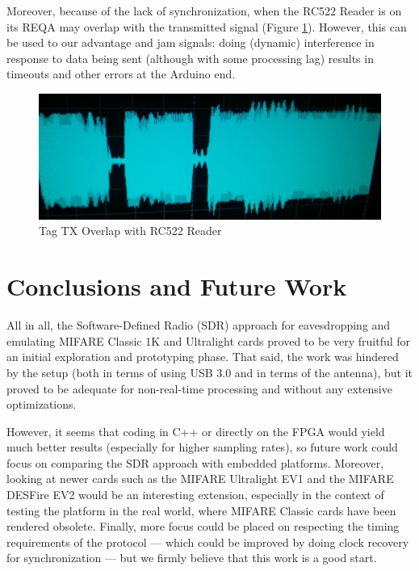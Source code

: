 \documentclass[fleqn,10pt]{SelfArx} %
\begin{document}
Moreover, because of the lack of synchronization, when the RC522 Reader is on its REQA may overlap with the transmitted signal (Figure \ref{fig:overlap}). However, this can be used to our advantage and jam signals: doing (dynamic) interference in response to data being sent (although with some processing lag) results in timeouts and other errors at the Arduino end.

\begin{figure}[h]
  \includegraphics[width=\linewidth]{img/overlap}
  \caption{Tag TX Overlap with RC522 Reader}
  \label{fig:overlap}
\end{figure}


\section{Conclusions and Future Work}
\label{sec:conclusions}

All in all, the Software-Defined Radio (SDR) approach for eavesdropping and emulating MIFARE Classic 1K and Ultralight cards proved to be very fruitful for an initial exploration and prototyping phase. That said, the work was hindered by the setup (both in terms of using USB 3.0 and in terms of the antenna), but it proved to be adequate for non-real-time processing and without any extensive optimizations. 

However, it seems that coding in C++ or directly on the FPGA would yield much better results (especially for higher sampling rates), so future work could focus on comparing the SDR approach with embedded platforms. Moreover, looking at newer cards such as the MIFARE Ultralight EV1 and the MIFARE DESFire EV2 would be an interesting extension, especially in the context of testing the platform in the real world, where MIFARE Classic cards have been rendered obsolete. Finally, more focus could be placed on respecting the timing requirements of the protocol --- which could be improved by doing clock recovery for synchronization --- but we firmly believe that this work is a good start.
\end{document}
